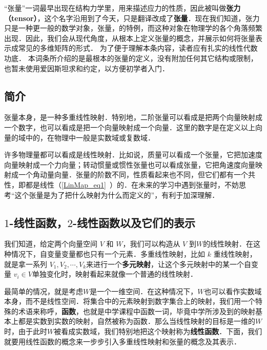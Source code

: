 


“张量”一词最早出现在结构力学里，用来描述应力的性质，因此被叫做\textbf{张力（tensor）}，这个名字沿用到了今天，只是翻译改成了\textbf{张量}．现在我们知道，张力只是一种更一般的数学对象，张量，的特例，而这种对象在物理学的各个角落频繁出现．因此，我们会从现代角度，从根本上定义张量的概念，并展示如何将张量表示成常见的多维矩阵的形式． 为了便于理解本条内容，读者应有扎实的线性代数功底． 本词条所介绍的是最根本的张量的定义，没有附加任何其它结构或限制，也暂未使用爱因斯坦求和约定，以方便初学者入门．

\subsection{简介}

张量本身，是一种多重线性映射．特别地，二阶张量可以看成是把两个向量映射成一个数字，也可以看成是把一个向量映射成一个向量．这里的数字是在定义以上向量的域中的，在物理中一般是实数域或复数域．

许多物理量都可以看成是线性映射．比如说，质量可以看成一个张量，它把加速度向量映射成一个力向量；转动惯量或惯性张量也可以看成张量，它把角速度向量映射成一个角动量向量．张量的阶数不同，性质看起来也不同，但它们都有一个共性，即都是线性（\autoref{LinMap_eq1}~）的．在未来的学习中遇到张量时，不妨思考“这个张量是为了把什么映射为什么而定义的”，有利于加深理解．

\subsection{$1$-线性函数，$2$-线性函数以及它们的表示}

我们知道，给定两个向量空间 $V$ 和 $W$，我们可以构造从 $V$ 到$W$的线性映射．在这种情况下，自变量变量都也只有一个元素．多重线性映射，比如 $k$ 重线性映射，就是拿一系列 $V_1, V_2, \cdots, V_k$来进行一个\textbf{多元映射}，让这个多元映射中的某一个自变量 ${v}_i\in V$单独变化时，映射看起来就像一个普通的线性映射．

最简单的情况，就是考虑$W$是一个一维空间．在这种情况下，$W$也可以看作实数域本身，而不是线性空间．将集合中的元素映射到数字集合上的映射，我们用一个特殊的术语来称呼，\textbf{函数}，也就是中学课程中函数一词，毕竟中学所涉及到的映射基本上都是实数到实数的映射，自然被称为函数．那么当线性映射的目标是一维的$W$时，由于此时$W$被看成实数域，我们特别地把这个映射称为\textbf{线性函数}．下面，我们就要用线性函数的概念来一步步引入多重线性映射和张量的概念及其表示．

